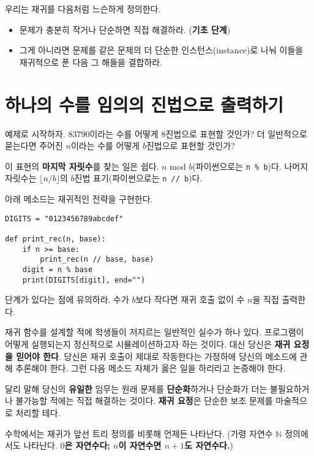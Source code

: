 \documentclass[a4paper]{oblivoir}
\begin{document}
우리는 재귀를 다음처럼 느슨하게 정의한다.

\begin{itemize}
    \item 문제가 충분히 작거나 단순하면 직접 해결하라. (\textbf{기초 단계})
    \item 그게 아니라면 문제를 같은 문제의 더 단순한 인스턴스(instance)로 나눠 이들을 재귀적으로 푼 다음 그 해들을 결합하라.
\end{itemize}

\section*{하나의 수를 임의의 진법으로 출력하기}
 예제로 시작하자. $83790$이라는 수를 어떻게 $8$진법으로 표현할 것인가? 더 일반적으로 묻는다면 주어진 $n$이라는 수를 어떻게 $b$진법으로 표현할 것인가?

이 표현의 \textbf{마지막 자릿수}를 찾는 일은 쉽다. $n \textrm{ mod } b$(파이썬으로는 \texttt{n \% b})다. 나머지 자릿수는 $\lfloor n/b \rfloor$의 $b$진법 표기(파이썬으로는 \texttt{n // b})다. 

아래 메소드는 재귀적인 전략을 구현한다. 

\begin{verbatim}
DIGITS = "0123456789abcdef"

def print_rec(n, base):
	if n >= base:
		print_rec(n // base, base)
	digit = n % base
	print(DIGITS[digit], end="")
\end{verbatim}

 단계가 있다는 점에 유의하라. 수가 $b$보다 작다면 재귀 호출 없이 수 $n$을 직접 출력한다.

재귀 함수를 설계할 적에 학생들이 저지르는 일반적인 실수가 하나 있다. 프로그램이 어떻게 실행되는지 정신적으로 시뮬레이션하고자 하는 것이다. 대신 당신은 \textbf{재귀 요정을 믿어야 한다}. 당신은 재귀 호출이 제대로 작동한다는 가정하에 당신의 메소드에 관해 추론해야 한다. 그런 다음 메소드 자체가 옳은 일을 하리라고 논증해야 한다. 

달리 말해 당신의 \textbf{유일한} 임무는 원래 문제를 \textbf{단순화}하거나 단순화가 더는 불필요하거나 불가능할 적에는 직접 해결하는 것이다. \textbf{재귀 요정}은 단순한 보조 문제를 마술적으로 처리할 테다.

수학에서는 재귀가 앞선 트리 정의를 비롯해 언제든 나타난다. (가령 자연수 $\mathbb{N}$ 정의에서도 나타난다. \textbf{$0$은 자연수다; $n$이 자연수면 $n+1$도 자연수다.})
\end{document}
